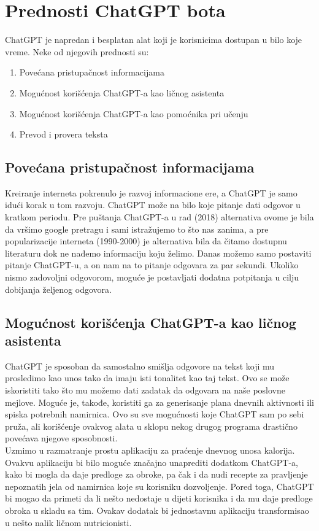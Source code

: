 \documentclass[fleqn, 12pt]{article}
\begin{document}
\newpage
\section{Prednosti ChatGPT bota}
ChatGPT je napredan i besplatan alat koji je korisnicima dostupan u bilo koje vreme. Neke od njegovih prednosti su:
\begin{enumerate}
  \item Povećana pristupačnost informacijama
  \item Mogućnost korišćenja ChatGPT-a kao ličnog asistenta
  \item Mogućnost korišćenja ChatGPT-a kao pomoćnika pri učenju
  \item Prevod i provera teksta
\end{enumerate}

    \subsection{Povećana pristupačnost informacijama}
        \begin{text}
            Kreiranje interneta pokrenulo je razvoj informacione ere, a ChatGPT je samo idući korak u tom razvoju. ChatGPT može na bilo koje pitanje dati odgovor u kratkom periodu. Pre puštanja ChatGPT-a u rad (2018) alternativa ovome je bila da vršimo google pretragu i sami istražujemo to što nas zanima, a pre popularizacije interneta (1990-2000) je alternativa bila da čitamo dostupnu literaturu dok ne nađemo informaciju koju želimo. Danas možemo samo postaviti pitanje ChatGPT-u, a on nam na to pitanje odgovara za par sekundi. Ukoliko nismo zadovoljni odgovorom, moguće je postavljati dodatna potpitanja u cilju dobijanja željenog odgovora.
        \end{text}

    \subsection{Mogućnost korišćenja ChatGPT-a kao ličnog asistenta}
        \begin{text}
            ChatGPT je sposoban da samostalno smišlja odgovore na tekst koji mu prosledimo kao unos tako da imaju isti tonalitet kao taj tekst. Ovo se može iskoristiti tako što mu možemo dati zadatak da odgovara na naše poslovne mejlove. Moguće je, takođe, koristiti ga za generisanje plana dnevnih aktivnosti ili spiska potrebnih namirnica. Ovo su sve mogućnosti koje ChatGPT sam po sebi pruža, ali korišćenje ovakvog alata u sklopu nekog drugog programa drastično povećava njegove sposobnosti.\\
            Uzmimo u razmatranje prostu aplikaciju za praćenje dnevnog unosa kalorija. Ovakvu aplikaciju bi bilo moguće značajno unaprediti dodatkom ChatGPT-a, kako bi mogla da daje predloge za obroke, pa čak i da nudi recepte za pravljenje nepoznatih jela od namirnica koje su korisniku dozvoljenje. Pored toga, ChatGPT bi mogao da primeti da li nešto nedostaje u dijeti korisnika i da mu daje predloge obroka u skladu sa tim. Ovakav dodatak bi jednostavnu aplikaciju transformisao u nešto nalik ličnom nutricionisti.
        \end{text}
\newpage        
\end{document}
